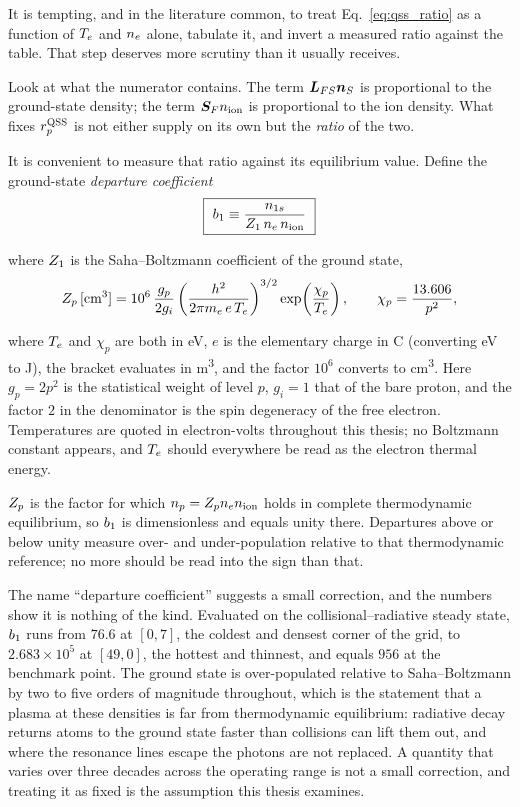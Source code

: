 It is tempting, and in the literature common, to treat
Eq.~\eqref{eq:qss_ratio} as a function of $T_e$ and $n_e$ alone, tabulate it,
and invert a measured ratio against the table. That step deserves more scrutiny
than it usually receives.

Look at what the numerator contains. The term $\bm{L}_{FS}\bm{n}_{S}$ is proportional to
the ground-state density; the term $\bm{S}_Fn_{\mathrm{ion}}$ is proportional to the ion
density. What fixes $r_p^{\mathrm{QSS}}$ is not either supply on its own but the
\emph{ratio} of the two.

It is convenient to measure that ratio against its equilibrium value. Define the
ground-state \emph{departure coefficient}
\begin{equation}
  \boxed{\ b_1 \equiv \frac{n_{1s}}{Z_{1}\,n_e\,n_{\mathrm{ion}}}\ }
  \label{eq:departure}
\end{equation}

\noindent where $Z_{1}$ is the Saha--Boltzmann coefficient of the ground
state,
\begin{equation}
  Z_{p}\,[\si{\cubic\centi\metre}]
  = 10^{6}\,\frac{g_p}{2g_i}
  \left(\frac{h^2}{2\pi m_e\,e\,T_e}\right)^{3/2}
  \exp\!\left(\frac{\chi_p}{T_e}\right),
  \qquad \chi_p = \frac{13.606}{p^2},
  \label{eq:saha_boltzmann}
\end{equation}

\noindent where $T_e$ and $\chi_p$ are both in \si{\electronvolt}, $e$ is the
elementary charge in \si{\coulomb} (converting \si{\electronvolt} to
\si{\joule}), the bracket evaluates in \si{\cubic\metre}, and the factor
$10^{6}$ converts to \si{\cubic\centi\metre}. Here $g_p = 2p^2$ is the
statistical weight of level $p$, $g_i = 1$ that of the bare proton, and the
factor $2$ in the denominator is the spin degeneracy of the free electron.
Temperatures are quoted in electron-volts throughout this thesis; no Boltzmann
constant appears, and $T_e$ should everywhere be read as the electron thermal
energy.

$Z_{p}$ is the factor for which $n_p = Z_{p}n_en_{\mathrm{ion}}$ holds in complete
thermodynamic equilibrium, so $b_1$ is dimensionless and equals unity there.
Departures above or below unity measure over- and under-population relative to
that thermodynamic reference; no more should be read into the sign than that.

The name ``departure coefficient'' suggests a small correction, and the
numbers show it is nothing of the kind. Evaluated on the collisional--radiative steady state, $b_1$ runs from
$76.6$ at $[0,7]$, the coldest and densest corner of the grid, to
$2.683\times10^{5}$ at $[49,0]$, the hottest and thinnest, and equals $956$ at
the benchmark point. The ground state is over-populated relative to
Saha--Boltzmann by two to five orders of magnitude throughout, which is the
statement that a plasma at these densities is far from thermodynamic
equilibrium: radiative decay returns atoms to the ground state faster than
collisions can lift them out, and where the resonance lines escape the photons
are not replaced. A quantity that varies over three decades across the
operating range is not a small correction, and treating it as fixed is the
assumption this thesis examines.

